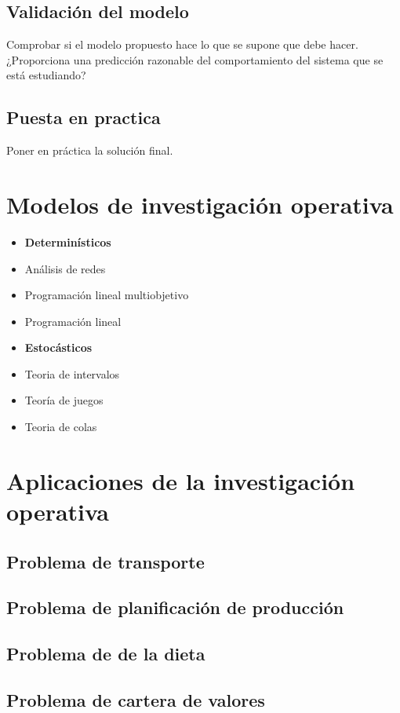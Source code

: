 \documentclass{article}
\begin{document}
\subsection{Validación del modelo}
Comprobar si el modelo propuesto hace lo que se supone que debe hacer.
¿Proporciona una predicción razonable del comportamiento del sistema que se está estudiando?
\subsection{Puesta en practica}
Poner en práctica la solución final.
\section{Modelos de investigación operativa}
\begin{minipage}[b]{0.5\linewidth}
\begin{itemize}
\item \textbf{Determinísticos}
\item Análisis de redes
\item Programación lineal multiobjetivo
\item Programación lineal
\end{itemize}
    \end{minipage} 
    \begin{minipage}[b]{0.5\linewidth} 
\begin{itemize}
\item \textbf{Estocásticos}
\item Teoria de intervalos
\item Teoría de juegos
\item Teoria de colas
\end{itemize}    
\end{minipage}

\section{Aplicaciones de la investigación operativa}
\subsection{Problema de transporte}
\subsection{Problema de planificación de producción}
\subsection{Problema de de la dieta}
\subsection{Problema de cartera de valores}
\end{document}
